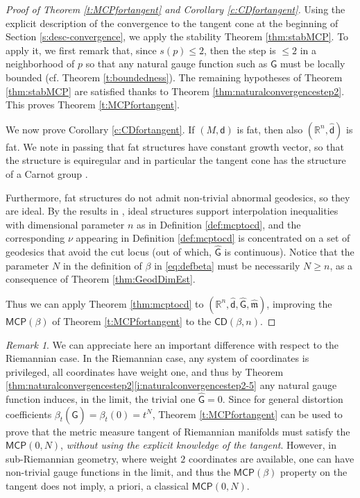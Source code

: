 \documentclass[11pt,a4paper]{article}
\theoremstyle{plain}
\theoremstyle{definition}
\theoremstyle{remark}
\newtheorem{remark}[theorem]{Remark}
\numberwithin{equation}{section}
\newcommand{\R}{\mathbb{R}} %
\newcommand{\CD}{\mathsf{CD}}
\newcommand{\MCP}{\mathsf{MCP}}
\newcommand{\mm}{\mathfrak m}
\newcommand{\sfd}{\mathsf d}
\newcommand{\sfG}{\mathsf G}
\begin{document}
\begin{proof}[Proof of Theorem \ref{t:MCPfortangent} and Corollary \ref{c:CDfortangent}]
Using the explicit description of the convergence to the tangent cone at the beginning of Section \ref{s:desc-convergence}, we apply the stability Theorem \ref{thm:stabMCP}. To apply it, we first remark that, since $s(p)\leq 2$, then the step is $\leq 2$ in a neighborhood of $p$ so that any natural gauge function such as $\sfG$ must be locally bounded (cf. Theorem \ref{t:boundedness}). The remaining hypotheses of Theorem \ref{thm:stabMCP} are satisfied thanks to Theorem \ref{thm:naturalconvergencestep2}. This proves Theorem \ref{t:MCPfortangent}.

We now prove Corollary \ref{c:CDfortangent}. If $(M,\sfd)$ is fat, then also $(\R^n,\hat{\sfd})$ is fat. We note in passing that fat structures have constant growth vector, so that the structure is equiregular and in particular the tangent cone has the structure of a Carnot group \cite{Bellaiche}.

Furthermore, fat structures do not admit non-trivial abnormal geodesics, so they are ideal. By the results in \cite{BRInv}, ideal structures support interpolation inequalities with dimensional parameter $n$ as in Definition \ref{def:mcptocd}, and the corresponding $\nu$ appearing in Definition \ref{def:mcptocd} is concentrated on a set of geodesics that avoid the cut locus (out of which, $\hat{\sfG}$ is continuous). Notice that the parameter $N$ in the definition of $\beta$ in \eqref{eq:defbeta} must be necessarily $N\geq n$, as a consequence of Theorem \ref{thm:GeodDimEst}. 

Thus we can apply Theorem \ref{thm:mcptocd} to $(\R^n,\hat{\sfd},\hat{\sfG},\hat{\mm})$, improving the $\MCP(\beta)$ of Theorem \ref{t:MCPfortangent} to the $\CD(\beta,n)$.
\end{proof}

\begin{remark}
We can appreciate here an important difference with respect to the Riemannian case. In the Riemannian case, any system of coordinates is privileged, all coordinates have weight one, and thus by Theorem \ref{thm:naturalconvergencestep2}\ref{i:naturalconvergencestep2-5} any natural gauge function induces, in the limit, the trivial one $\hat{\sfG} =0$. Since for general distortion coefficients $\beta_t(\hat{\sfG})=\beta_t(0)=t^N$, Theorem \ref{t:MCPfortangent} can be used to prove that the metric measure tangent of Riemannian manifolds must satisfy the $\MCP(0,N)$, \emph{without using the explicit knowledge of the tangent}. However, in sub-Riemannian geometry, where weight $2$ coordinates are available, one can have non-trivial gauge functions in the limit, and thus the $\MCP(\beta)$ property on the tangent does not imply, a priori, a classical $\MCP(0,N)$.
\end{remark}
\end{document}
